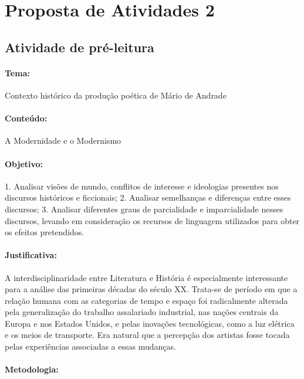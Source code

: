 \documentclass[11pt]{extarticle}
\begin{document}
\section{Proposta de Atividades 2}

\subsection{Atividade de pré-leitura}


\paragraph{Tema:} Contexto histórico da produção poética de Mário de
Andrade

\paragraph{Conteúdo:} A Modernidade e o Modernismo

\paragraph{Objetivo:} 1. Analisar visões de mundo, conflitos de interesse e
ideologias presentes nos discursos históricos e ficcionais; 2. Analisar
semelhanças e diferenças entre esses discursos; 3. Analisar diferentes
graus de parcialidade e imparcialidade nesses discursos, levando em
consideração os recursos de linguagem utilizados para obter os efeitos
pretendidos.

\paragraph{Justificativa:} A interdisciplinaridade entre Literatura e
História é especialmente interessante para a análise das primeiras
décadas do século XX. Trata-se de período em que a relação humana com as
categorias de tempo e espaço foi radicalmente alterada pela
generalização do trabalho assalariado industrial, nas nações centrais da
Europa e nos Estados Unidos, e pelas inovações tecnológicas, como a luz
elétrica e os meios de transporte. Era natural que a percepção dos
artistas fosse tocada pelas experiências associadas a essas mudanças.

\paragraph{Metodologia:}
\end{document}
